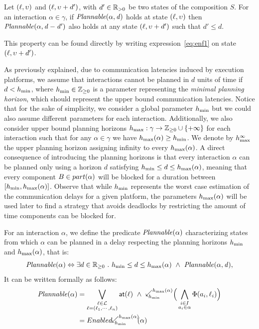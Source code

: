 \begin{property}\label{pt:plnIn2}
Let $(\ell,\upsilon)$ and $(\ell,\upsilon+d')$, with $d'\in\mathbb{R}_{> 0}$ be two states of 
the composition $S$. For an interaction $\alpha\in\gamma$, if $\mathit{Plannable(\alpha,d)}$ 
holds at state $(\ell,\upsilon)$ then $\mathit{Plannable(\alpha,d-d')}$ 
also holds at any state $(\ell,\upsilon+d')$ such that $d'\le d$.
\end{property}
This property can be found directly by writing expression~\ref{eq:enf1} on state 
$(\ell,\upsilon+d')$.

As previously explained, due to communication latencies induced by execution platforms, 
we assume that interactions cannot be planned in $d$ units of time if $d < h_{\min}$, 
where $h_{\min} \in \mathbb{Z}_{\ge 0}$ is a parameter representing the \emph{minimal planning horizon}, 
which should represent the upper bound communication latencies.
Notice that for the sake of simplicity, we consider a global parameter $h_{\min}$ but 
we could also assume different parameters for each interaction.
Additionally, we also consider upper bound planning horizons 
$h_{\max} : \gamma \to \mathbb{Z}_{\ge 0}\cup\{ +\infty \}$ 
for each interaction such that for any $\alpha\in\gamma$ we have $h_{\max}(\alpha) \geq h_{\min}$.
We denote by $h_{\max}^{\infty}$ the upper planning horizon assigning infinity to every $h_{\max}(\alpha)$.
A direct consequence of introducing the planning horizons is that every interaction $\alpha$ 
can be planned only using a horizon $d$ satisfying $h_{\min} \leq d \leq h_{\max}(\alpha)$,
meaning that every component $B\in part(\alpha)$ will be blocked for a duration between
$[h_{\min},h_{\max}(\alpha)]$. Observe that while $h_{\min}$ represents the worst case estimation of the 
communication delays for a given platform, the parameters $h_{\max}(\alpha)$ will be used later 
to find a strategy that avoids deadlocks by restricting the amount of time components 
can be blocked for.

For an interaction $\alpha$, we define the predicate $\mathit{Plannable(\alpha)}$ 
characterizing states from which $\alpha$ can be planned in a delay respecting 
the planning horizons $h_{\min}$ and $h_{\max}(\alpha)$, that is:
\begin{displaymath}
\plntxt{\alpha}\Leftrightarrow\exists d\in\realpoz\ .\ \hmin\leq d\leq\hmax(\alpha)\ 
  \wedge\ \plnIntxt{\alpha}{d},
\end{displaymath}
It can be written formally as follows:
\begin{align}\label{eq:pln}
 \plntxt{\alpha}&=\bigvee_{\substack{\loc\in\Loc\\\loc=(\loc_1,\cdots,\loc_n)}}\al{\loc}\ \wedge\
  \backwardp{\hmin}{\hmx} \Big(\bigwedge_{\substack{i\in I\\a_i\in\alpha}}\Phi(a_i,\loc_i)\Big)\\
                &=\enabledbackwardb{\alpha}{\hmin}{\hmx}
\end{align}

